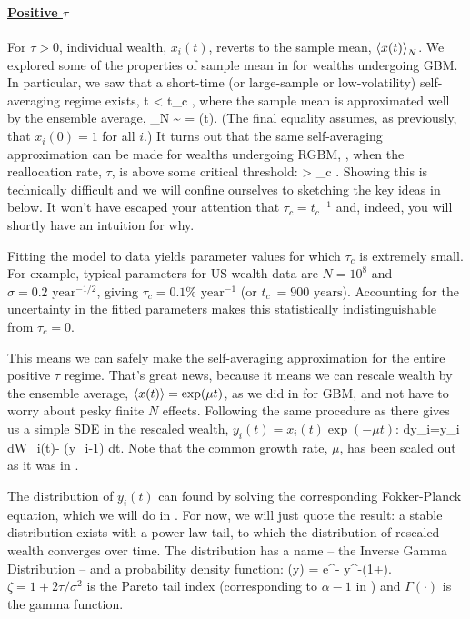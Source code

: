\paragraph{\underline{Positive $\tau$}}
\mbox{}

For $\tau>0$, individual wealth, $x_i(t)$, reverts to the sample mean, $\left\langle x(t) \right\rangle_N$. We explored some of the properties of sample mean in  for wealths undergoing GBM. In particular, we saw that a short-time (or large-sample or low-volatility) self-averaging regime exists,
\be
t < t_c \equiv {},
\ee
where the sample mean is approximated well by the ensemble average,
\be
{}_N \sim {} = \exp(\mu t).
\ee
(The final equality assumes, as previously, that $x_i(0)=1$ for all $i$.) It turns out that the same self-averaging approximation can be made for wealths undergoing RGBM, , when the reallocation rate, $\tau$, is above some critical threshold:
\be
\tau > \tau_c \equiv {}.
\ee
Showing this is technically difficult \cite{Bouchaud2015b} and we will confine ourselves to sketching the key ideas in  below. It won't have escaped your attention that $\tau_c={t_c}^{-1}$ and, indeed, you will shortly have an intuition for why. 

Fitting the model to data yields parameter values for which $\tau_c$ is extremely small. For example, typical parameters for US wealth data are $N=10^8$ and $\sigma=0.2\text{ year}^{-1/2}$, giving $\tau_c = 0.1\%\text{ year}^{-1}$ (or $t_c\ = 900\text{ years}$). Accounting for the uncertainty in the fitted parameters makes this statistically indistinguishable from $\tau_c=0$.

This means we can safely make the self-averaging approximation for the entire positive $\tau$ regime. That's great news, because it means we can rescale wealth by the ensemble average, $\left\langle x(t) \right\rangle=\exp(\mu t)$, as we did in  for GBM, and not have to worry about pesky finite $N$ effects. Following the same procedure as there gives us a simple SDE in the rescaled wealth, $y_i(t) = x_i(t)\exp(-\mu t)$:
\be
dy_i=y_i \sigma dW_i\left(t\right)- \tau (y_i-1) dt.
\ee
Note that the common growth rate, $\mu$, has been scaled out as it was in .

The distribution of $y_i\left(t\right)$ can found by solving the corresponding Fokker-Planck equation, which we will do in . For now, we will just quote the result: a stable distribution exists with a power-law tail, to which the distribution of rescaled wealth converges over time. The distribution has a name -- the Inverse Gamma Distribution -- and a probability density function:
\be
{}\left(y\right) = \frac{\left(\zeta-1\right)^\zeta}{\Gamma\left(\zeta\right)} e^{-} y^{-\left(1+\zeta\right)}.
\ee
$\zeta=1+2\tau/\sigma^2$ is the Pareto tail index (corresponding to $\alpha-1$ in ) and $\Gamma\left(\cdot\right)$ is the gamma function.


